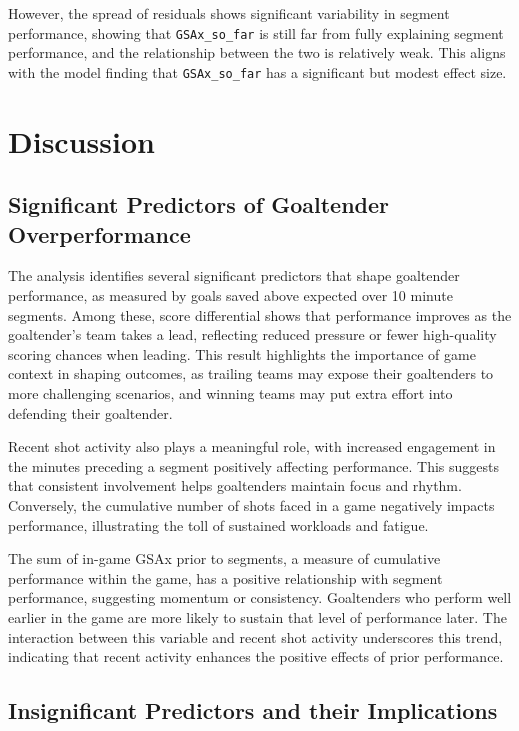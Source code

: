\documentclass[
  letterpaper,
  DIV=11,
  numbers=noendperiod]{scrartcl}
\begin{document}
However, the spread of residuals shows significant variability in
segment performance, showing that \texttt{GSAx\_so\_far} is still far
from fully explaining segment performance, and the relationship between
the two is relatively weak. This aligns with the model finding that
\texttt{GSAx\_so\_far} has a significant but modest effect size.

\section{Discussion}\label{sec-discussion}

\subsection{Significant Predictors of Goaltender
Overperformance}\label{significant-predictors-of-goaltender-overperformance}

The analysis identifies several significant predictors that shape
goaltender performance, as measured by goals saved above expected over
10 minute segments. Among these, score differential shows that
performance improves as the goaltender's team takes a lead, reflecting
reduced pressure or fewer high-quality scoring chances when leading.
This result highlights the importance of game context in shaping
outcomes, as trailing teams may expose their goaltenders to more
challenging scenarios, and winning teams may put extra effort into
defending their goaltender.

Recent shot activity also plays a meaningful role, with increased
engagement in the minutes preceding a segment positively affecting
performance. This suggests that consistent involvement helps goaltenders
maintain focus and rhythm. Conversely, the cumulative number of shots
faced in a game negatively impacts performance, illustrating the toll of
sustained workloads and fatigue.

The sum of in-game GSAx prior to segments, a measure of cumulative
performance within the game, has a positive relationship with segment
performance, suggesting momentum or consistency. Goaltenders who perform
well earlier in the game are more likely to sustain that level of
performance later. The interaction between this variable and recent shot
activity underscores this trend, indicating that recent activity
enhances the positive effects of prior performance.

\subsection{Insignificant Predictors and their
Implications}\label{insignificant-predictors-and-their-implications}
\end{document}
